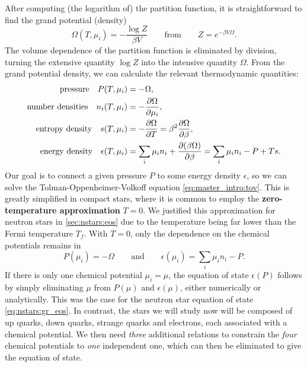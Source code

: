 After computing (the logarithm of) the partition function, it is straightforward to find the grand potential (density)
\begin{equation}
	\Omega(T, \mu_i) = -\frac{\log Z}{\beta V}
	\qquad \text{from} \qquad
	Z = e^{-\beta V \Omega} .
\label{eq:master_intro:grand_potential}
\end{equation}
The volume dependence of the partition function is eliminated by division, turning the extensive quantity $\log Z$ into the intensive quantity $\Omega$.
From the grand potential density, we can calculate the relevant thermodynamic quantities:
\cite[section 4.9]{ref:kardar}
\begin{subequations}
\begin{align}
	\text{pressure} \quad P(T, \mu_i) &= -\Omega, \label{eq:master_intro:pressure} \\
	\text{number densities} \quad n_i(T, \mu_i) &= -\pdv{\Omega}{\mu_i}, \label{eq:master_intro:densities} \\
	\text{entropy density} \quad s(T, \mu_i) &= -\pdv{\Omega}{T} = \beta^2 \pdv{\Omega}{\beta}, \label{eq:master_intro:entropy} \\
	\text{energy density} \quad \epsilon(T, \mu_i) &= \sum_i \mu_i n_i + \pdv{(\beta \Omega)}{\beta} = \sum_i \mu_i n_i - P + T s. \label{eq:master_intro:energy_density}
\end{align}
\end{subequations}
Our goal is to connect a given pressure $P$ to some energy density $\epsilon$, so we can solve the Tolman-Oppenheimer-Volkoff equation \eqref{eq:master_intro:tov}.
This is greatly simplified in compact stars, where it is common to employ the \textbf{zero-temperature approximation} $T=0$.
We justified this approximation for neutron stars in \cref{sec:nstars:eos} due to the temperature being far lower than the Fermi temperature $T_f$.
With $T = 0$, only the dependence on the chemical potentials remains in
\begin{equation}
	P(\mu_i) = -\Omega
	\qquad \text{and} \qquad
	\epsilon(\mu_i) = \sum_i \mu_i n_i - P.
\end{equation}
If there is only one chemical potential $\mu_i = \mu$,
the equation of state $\epsilon(P)$ follows by simply eliminating $\mu$ from $P(\mu)$ and $\epsilon(\mu)$, either numerically or analytically.
This was the case for the neutron star equation of state \eqref{eq:nstars:gr_eos}.
In contrast, the stars we will study now will be composed of up quarks, down quarks, strange quarks and electrons, each associated with a chemical potential.
We then need \emph{three} additional relations to constrain the \emph{four} chemical potentials to \emph{one} independent one, which can then be eliminated to give the equation of state.

